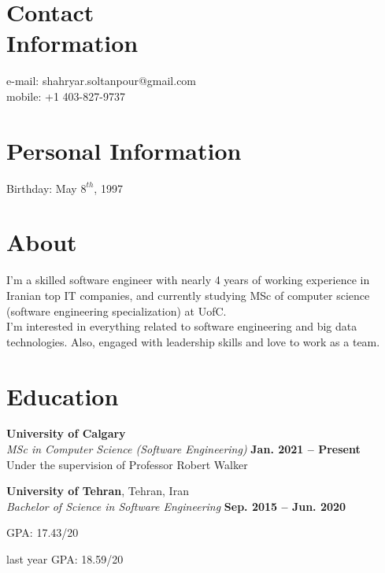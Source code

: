 \documentclass[line, mm]{sampleCV}
\begin{document}
\begin{resume}

    \section{\mysidestyle Contact\\Information}
    
   e-mail: shahryar.soltanpour@gmail.com\\
    mobile: +1 403-827-9737
    
    \section{\mysidestyle Personal Information}
   
    Birthday: May $8^{th}$, 1997

	\section{\mysidestyle About}
	I'm a skilled software engineer with nearly 4 years of working experience in Iranian top IT companies, and currently studying MSc of computer science (software engineering specialization) at UofC. \\
	I'm interested in everything related to software engineering and big data technologies. Also, engaged with leadership skills and love to work as a team. 
    
\section{\mysidestyle Education}
	\begin{list2}
	\setlength\itemsep{0.5em}
	\item \textbf{University of Calgary}\vspace{2mm}\\\vspace{1mm}
	\textsl{MSc in Computer Science (Software Engineering)} \hfill \textbf{ Jan. 2021 -- Present}\\ Under the supervision of Professor Robert Walker%
	
	
    \item \textbf{University of Tehran}, Tehran, Iran \vspace{2mm}\\\vspace{1mm}
    \textsl{Bachelor of Science in Software Engineering} \hfill \textbf{ Sep. 2015 -- Jun. 2020}\vspace{-3mm}\\\vspace{-1mm}%
    \begin{list2}
        \item GPA: 17.43/20
       	\item last year GPA: 18.59/20
       	

\end{list2}
\end{list2}
\end{resume}
\end{document}
